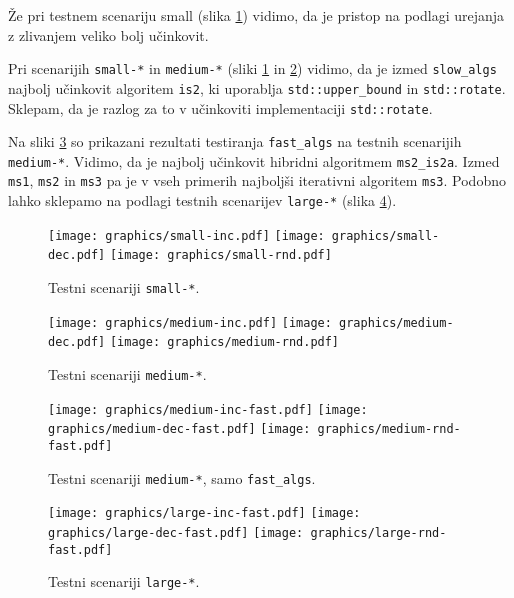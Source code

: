 \documentclass[11pt,a4paper]{article}
\theoremstyle{plain}
\theoremstyle{definition}
\begin{document}
Že pri testnem scenariju small (slika \ref{fig:small}) vidimo, da je pristop na podlagi urejanja z zlivanjem veliko bolj učinkovit.

Pri scenarijih \lstinline!small-*! in \lstinline!medium-*! (sliki \ref{fig:small} in \ref{fig:medium}) vidimo, da je izmed \lstinline!slow_algs! najbolj učinkovit algoritem \lstinline!is2!, ki uporablja \lstinline!std::upper_bound! in \lstinline!std::rotate!. Sklepam, da je razlog za to v učinkoviti implementaciji \lstinline!std::rotate!.

Na sliki \ref{fig:medium-fast} so prikazani rezultati testiranja \lstinline!fast_algs! na testnih scenarijih \lstinline!medium-*!. Vidimo, da je najbolj učinkovit hibridni algoritmem \lstinline!ms2_is2a!. Izmed \lstinline!ms1!, \lstinline!ms2! in \lstinline!ms3! pa je v vseh primerih najboljši iterativni algoritem \lstinline!ms3!. Podobno lahko sklepamo na podlagi testnih scenarijev \lstinline!large-*! (slika \ref{fig:large-fast}).

\begin{figure}
\texttt{[image: graphics/small-inc.pdf]}
\texttt{[image: graphics/small-dec.pdf]}
\texttt{[image: graphics/small-rnd.pdf]}
\caption{Testni scenariji \lstinline!small-*!.}
\label{fig:small}
\end{figure}

\begin{figure}
\texttt{[image: graphics/medium-inc.pdf]}
\texttt{[image: graphics/medium-dec.pdf]}
\texttt{[image: graphics/medium-rnd.pdf]}
\caption{Testni scenariji \lstinline!medium-*!.}
\label{fig:medium}
\end{figure}

\begin{figure}
\texttt{[image: graphics/medium-inc-fast.pdf]}
\texttt{[image: graphics/medium-dec-fast.pdf]}
\texttt{[image: graphics/medium-rnd-fast.pdf]}
\caption{Testni scenariji \lstinline!medium-*!, samo \lstinline!fast_algs!.}
\label{fig:medium-fast}
\end{figure}

\begin{figure}
\texttt{[image: graphics/large-inc-fast.pdf]}
\texttt{[image: graphics/large-dec-fast.pdf]}
\texttt{[image: graphics/large-rnd-fast.pdf]}
\caption{Testni scenariji \lstinline!large-*!.}
\label{fig:large-fast}
\end{figure}
\end{document}
